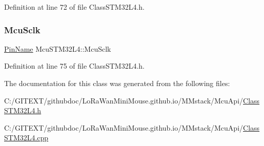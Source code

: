 Definition at line 72 of file Class\+S\+T\+M32\+L4.\+h.

\mbox{\label{class_mcu_s_t_m32_l4_a84284db2727aa1409e7872cd26dee564}} 
\subsubsection{\texorpdfstring{Mcu\+Sclk}{McuSclk}}
{\footnotesize\ttfamily \mbox{\hyperlink{_class_s_t_m32_l0_8h_a5ceb873075d76667eb54dc6a7d2734d1}{Pin\+Name}} Mcu\+S\+T\+M32\+L4\+::\+Mcu\+Sclk}



Definition at line 75 of file Class\+S\+T\+M32\+L4.\+h.



The documentation for this class was generated from the following files\+:\begin{DoxyCompactItemize}
\item 
C\+:/\+G\+I\+T\+E\+X\+T/githubdoc/\+Lo\+Ra\+Wan\+Mini\+Mouse.\+github.\+io/\+M\+Mstack/\+Mcu\+Api/\mbox{\hyperlink{_class_s_t_m32_l4_8h}{Class\+S\+T\+M32\+L4.\+h}}\item 
C\+:/\+G\+I\+T\+E\+X\+T/githubdoc/\+Lo\+Ra\+Wan\+Mini\+Mouse.\+github.\+io/\+M\+Mstack/\+Mcu\+Api/\mbox{\hyperlink{_class_s_t_m32_l4_8cpp}{Class\+S\+T\+M32\+L4.\+cpp}}\end{DoxyCompactItemize}
